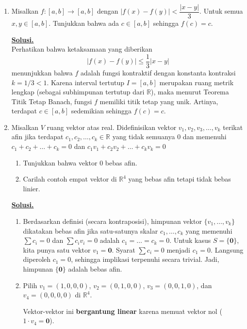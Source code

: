 \documentclass[12pt,twoside]{article}
\newenvironment{solution}
{
	\par\noindent\textbf{\underline{Solusi.}}\\
}
{
	\par
}
\begin{document}
\begin{enumerate}
  \item Misalkan $f:[a,b]\to[a,b]$ dengan $|f(x)-f(y)|<\dfrac{|x-y|}{3}$. Untuk semua $x,y\in [a,b]$. Tunjukkan bahwa ada $c\in[a,b]$ sehingga $f(c)=c$.
        \begin{solution}
          Perhatikan bahwa ketaksamaan yang diberikan
          \[
            |f(x)-f(y)| \le \frac{1}{3} |x-y|
          \]
          menunjukkan bahwa $f$ adalah fungsi kontraktif dengan konstanta kontraksi $k=1/3<1$.
          Karena interval tertutup $I=[a,b]$ merupakan ruang metrik lengkap (sebagai subhimpunan tertutup dari $\mathbb{R}$), maka menurut Teorema Titik Tetap Banach, fungsi $f$ memiliki titik tetap yang unik.
          Artinya, terdapat $c\in[a,b]$ sedemikian sehingga $f(c)=c$.
        \end{solution}

  \item Misalkan $V$ ruang vektor atas real. Didefinisikan vektor $v_1,v_2,v_3,\dots,v_k$ terikat afin jika terdapat $c_1,c_2,\dots,c_k\in\mathbb{R}$ yang tidak semuanya $0$ dan memenuhi $c_1+c_2+\dots+c_k=0$ dan $c_1v_1+c_2v_2+\dots+c_kv_k=0$
        \begin{enumerate}
          \item [(a)] Tunjukkan bahwa vektor 0 bebas afin.
          \item[(b)] Carilah contoh empat vektor di $\mathbb{R}^4$ yang bebas afin tetapi tidak bebas  linier.
        \end{enumerate}
        \begin{solution}
          \begin{enumerate}
            \item[(a)] Berdasarkan definisi (secara kontraposisi), himpunan vektor $\{v_1, \dots, v_k\}$ dikatakan bebas afin jika satu-satunya skalar $c_1, \dots, c_k$ yang memenuhi $\sum c_i = 0$ dan $\sum c_i v_i = 0$ adalah $c_1 = \dots = c_k = 0$.
                  Untuk kasus $S=\{\mathbf{0}\}$, kita punya satu vektor $v_1=\mathbf{0}$.
                  Syarat $\sum c_i = 0$ menjadi $c_1=0$.
                  Langsung diperoleh $c_1=0$, sehingga implikasi terpenuhi secara trivial.
                  Jadi, himpunan $\{\mathbf{0}\}$ adalah bebas afin.

            \item[(b)] Pilih $v_1=(1,0,0,0)$, $v_2=(0,1,0,0)$, $v_3=(0,0,1,0)$, dan $v_4=(0,0,0,0)$ di $\mathbb{R}^4$.

                  Vektor-vektor ini \textbf{bergantung linear} karena memuat vektor nol ($1\cdot v_4 = \mathbf{0}$).


\end{enumerate}
\end{solution}
\end{enumerate}
\end{document}
